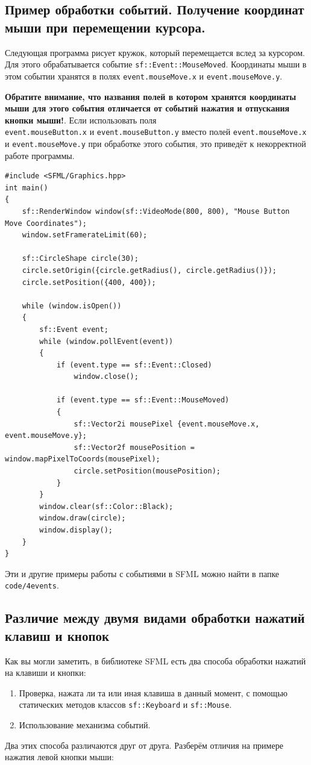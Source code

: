 \documentclass{article}
\begin{document}
\newpage
\subsection*{Пример обработки событий. Получение координат мыши при перемещении курсора.}

Следующая программа рисует кружок, который перемещается вслед за курсором. Для этого обрабатывается событие \texttt{sf::Event::MouseMoved}. Координаты мыши в этом событии хранятся в полях \texttt{event.mouseMove.x} и \texttt{event.mouseMove.у}. 

\textbf{Обратите внимание, что названия полей в котором хранятся координаты мыши для этого события отличается от событий нажатия и отпускания кнопки мыши!}. Если использовать поля\\ \texttt{event.mouseButton.x} и \texttt{event.mouseButton.у} вместо полей \texttt{event.mouseMove.x} и \texttt{event.mouseMove.у} при обработке этого события, это приведёт к некорректной работе программы.
\begin{lstlisting}
#include <SFML/Graphics.hpp>
int main()
{
    sf::RenderWindow window(sf::VideoMode(800, 800), "Mouse Button Move Coordinates");
    window.setFramerateLimit(60);

    sf::CircleShape circle(30);
    circle.setOrigin({circle.getRadius(), circle.getRadius()});
    circle.setPosition({400, 400});

    while (window.isOpen()) 
    {
        sf::Event event;
        while (window.pollEvent(event)) 
        {
            if (event.type == sf::Event::Closed)
                window.close();

            if (event.type == sf::Event::MouseMoved)
            {
                sf::Vector2i mousePixel {event.mouseMove.x, event.mouseMove.y};
                sf::Vector2f mousePosition = window.mapPixelToCoords(mousePixel);
                circle.setPosition(mousePosition);
            }
        }
        window.clear(sf::Color::Black);
        window.draw(circle);
        window.display();
    }
}
\end{lstlisting}

Эти и другие примеры работы с событиями в SFML можно найти в папке \texttt{code/4events}.


\newpage
\subsection*{Различие между двумя видами обработки нажатий клавиш и кнопок}
Как вы могли заметить, в библиотеке SFML есть два способа обработки нажатий на клавиши и кнопки:
\begin{enumerate}
\item Проверка, нажата ли та или иная клавиша в данный момент, с помощью статических методов классов \texttt{sf::Keyboard} и \texttt{sf::Mouse}.
\item Использование механизма событий.
\end{enumerate}
Два этих способа различаются друг от друга. Разберём отличия на примере нажатия левой кнопки мыши:
\end{document}
